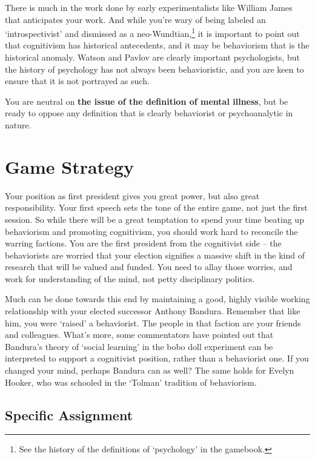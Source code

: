 \begin{refsection}
There is much in the work done by early experimentalists like William James that anticipates your work. And while you're wary of being labeled an `introspectivist' and dismissed as a neo-Wundtian,\footnote{See the history of the definitions of `psychology' in the gamebook.} it is important to point out that cognitivism has historical antecedents, and it may be behaviorism that is the historical anomaly. Watson and Pavlov are clearly important psychologists, but the history of psychology has not always been behavioristic, and you are keen to ensure that it is not portrayed as such.

You are neutral on \textbf{the issue of the definition of mental illness}, but be ready to oppose any definition that is clearly behaviorist or psychoanalytic in nature.

\section{Game Strategy}
\label{gamestrategy}

Your position as first president gives you great power, but also great responsibility. Your first speech sets the tone of the entire game, not just the first session. So while there will be a great temptation to spend your time beating up behaviorism and promoting cognitivism, you should work hard to reconcile the warring factions. You are the first president from the cognitivist side – the behaviorists are worried that your election signifies a massive shift in the kind of research that will be valued and funded. You need to allay those worries, and work for understanding of the mind, not petty disciplinary politics.

Much can be done towards this end by maintaining a good, highly visible working relationship with your elected successor Anthony Bandura. Remember that like him, you were ‘raised’ a behaviorist. The people in that faction are your friends and colleagues. What’s more, some commentators have pointed out that Bandura’s theory of ‘social learning’ in the bobo doll experiment can be interpreted to support a cognitivist position, rather than a behaviorist one. If you changed your mind, perhaps Bandura can as well? The same holds for Evelyn Hooker, who was schooled in the `Tolman' tradition of behaviorism.

\subsection{Specific Assignment}
\label{specificassignment}


\end{refsection}
